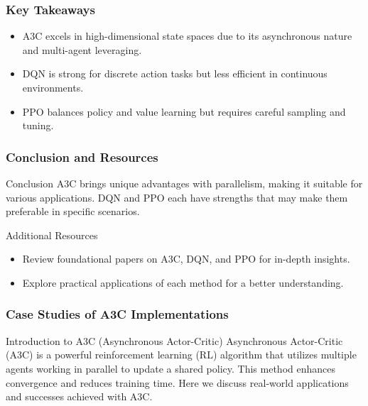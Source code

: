 \documentclass{beamer}
\begin{document}
\begin{frame}[fragile]
    \frametitle{Key Takeaways}
    \begin{itemize}
        \item A3C excels in high-dimensional state spaces due to its asynchronous nature and multi-agent leveraging.
        \item DQN is strong for discrete action tasks but less efficient in continuous environments.
        \item PPO balances policy and value learning but requires careful sampling and tuning.
    \end{itemize}
\end{frame}

\begin{frame}[fragile]
    \frametitle{Conclusion and Resources}
    \begin{block}{Conclusion}
        A3C brings unique advantages with parallelism, making it suitable for various applications. DQN and PPO each have strengths that may make them preferable in specific scenarios.
    \end{block}
    \begin{block}{Additional Resources}
        \begin{itemize}
            \item Review foundational papers on A3C, DQN, and PPO for in-depth insights.
            \item Explore practical applications of each method for a better understanding.
        \end{itemize}
    \end{block}
\end{frame}

\begin{frame}[fragile]
    \frametitle{Case Studies of A3C Implementations}
    \begin{block}{Introduction to A3C (Asynchronous Actor-Critic)}
        Asynchronous Actor-Critic (A3C) is a powerful reinforcement learning (RL) algorithm that utilizes multiple agents working in parallel to update a shared policy. This method enhances convergence and reduces training time. Here we discuss real-world applications and successes achieved with A3C.
    \end{block}
\end{frame}
\end{document}
